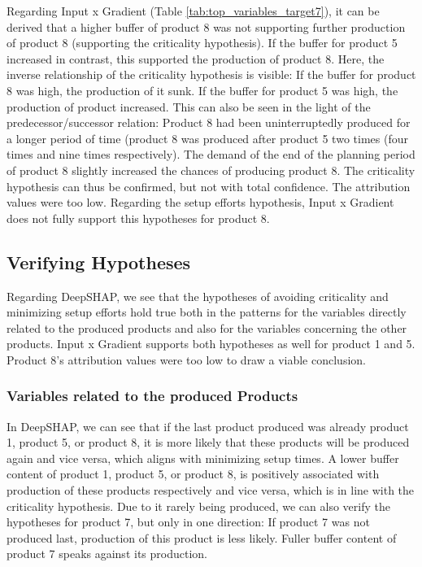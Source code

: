 Regarding Input x Gradient (Table \ref{tab:top_variables_target7}), it can be derived that a higher buffer of product 8 was not supporting further production of product 8 (supporting the criticality hypothesis). If the buffer for product 5 increased in contrast, this supported the production of product 8. Here, the inverse relationship of the criticality hypothesis is visible: If the buffer for product 8 was high, the production of it sunk. If the buffer for product 5 was high, the production of product increased. This can also be seen in the light of the predecessor/successor relation: Product 8 had been uninterruptedly produced for a longer period of time (product 8 was produced after product 5 two times (four times and nine times respectively). The demand of the end of the planning period of product 8 slightly increased the chances of producing product 8. The criticality hypothesis can thus be confirmed, but not with total confidence. The attribution values were too low. Regarding the setup efforts hypothesis, Input x Gradient does not fully support this hypotheses for product 8.

\subsection{Verifying Hypotheses}
Regarding DeepSHAP, we see that the hypotheses of avoiding criticality and minimizing setup efforts hold true both in the patterns for the variables directly related to the produced products and also for the variables concerning the other products.
Input x Gradient supports both hypotheses as well for product 1 and 5. Product 8's attribution values were too low to draw a viable conclusion.

\subsubsection{Variables related to the produced Products}
In DeepSHAP, we can see that if the last product produced was already product 1, product 5, or product 8, it is more likely that these products will be produced again and vice versa, which aligns with minimizing setup times.
A lower buffer content of product 1, product 5, or product 8, is positively associated with production of these products respectively and vice versa, which is in line with the criticality hypothesis.
Due to it rarely being produced, we can also verify the hypotheses for product 7, but only in one direction: If product 7 was not produced last, production of this product is less likely. Fuller buffer content of product 7 speaks against its production.

